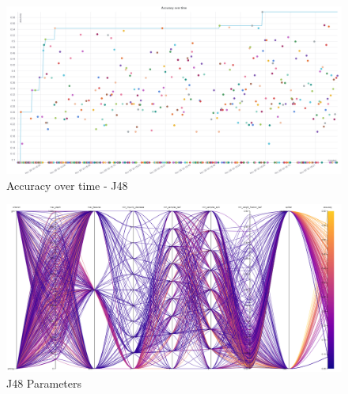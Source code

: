 \documentclass[11pt]{article}
\begin{document}
\begin{appendices}
\begin{figure}
  \caption {Accuracy over time - J48} \label{J48AccOverTime}
  \centering
  \includegraphics[width = \textwidth, height = \textwidth, keepaspectratio]{Images/J48 Acc over time.png}
\end{figure}

\begin{figure}
  \caption {J48 Parameters} \label{ParallelCoordJ48}
  \centering 
  \includegraphics[width = \textwidth, height = \textwidth, keepaspectratio]{Images/J48 ParallelCoordGraph.png}
\end{figure}




\end{appendices}
\end{document}
